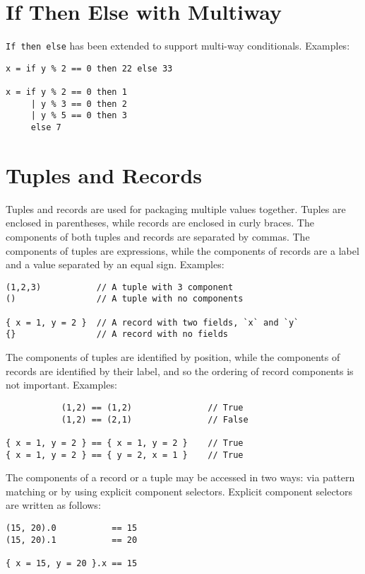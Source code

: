 \section{If Then Else with Multiway}\label{if-then-else-with-multiway}

\texttt{If\ then\ else} has been extended to support multi-way
conditionals. Examples:

\begin{verbatim}
x = if y % 2 == 0 then 22 else 33

x = if y % 2 == 0 then 1
     | y % 3 == 0 then 2
     | y % 5 == 0 then 3
     else 7
\end{verbatim}

\section{Tuples and Records}\label{tuples-and-records}

Tuples and records are used for packaging multiple values together.
Tuples are enclosed in parentheses, while records are enclosed in
curly braces. The components of both tuples and records are separated by
commas. The components of tuples are expressions, while the components
of records are a label and a value separated by an equal sign. Examples:

\begin{verbatim}
(1,2,3)           // A tuple with 3 component
()                // A tuple with no components

{ x = 1, y = 2 }  // A record with two fields, `x` and `y`
{}                // A record with no fields
\end{verbatim}

The components of tuples are identified by position, while the
components of records are identified by their label, and so the ordering
of record components is not important. Examples:

\begin{verbatim}
           (1,2) == (1,2)               // True
           (1,2) == (2,1)               // False

{ x = 1, y = 2 } == { x = 1, y = 2 }    // True
{ x = 1, y = 2 } == { y = 2, x = 1 }    // True
\end{verbatim}

The components of a record or a tuple may be accessed in two ways: via
pattern matching or by using explicit component selectors. Explicit
component selectors are written as follows:

\begin{verbatim}
(15, 20).0           == 15
(15, 20).1           == 20

{ x = 15, y = 20 }.x == 15
\end{verbatim}


